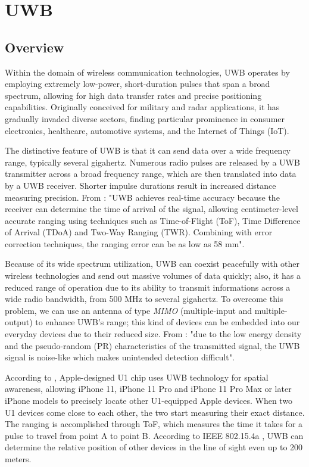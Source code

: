 \documentclass[english]{article}
\begin{document}
\section{UWB}\label{sec:uwb}
\subsection{Overview}
Within the domain of wireless communication technologies, UWB operates by employing extremely low-power, short-duration pulses that span a broad spectrum, allowing for high data transfer rates and precise positioning capabilities. Originally conceived for military and radar applications, it has gradually invaded diverse sectors, finding particular prominence in consumer electronics, healthcare, automotive systems, and the Internet of Things (IoT).

The distinctive feature of UWB is that it can send data over a wide frequency range, typically several gigahertz. Numerous radio pulses are released by a UWB transmitter across a broad frequency range, which are then translated into data by a UWB receiver. Shorter impulse durations result in increased distance measuring precision. From \cite{Coppens2022}: "UWB achieves real-time accuracy because the receiver can determine the time of arrival of the signal, allowing centimeter-level accurate ranging using techniques such as Time-of-Flight (ToF), Time Difference of Arrival (TDoA) and Two-Way Ranging (TWR). Combining with error correction techniques, the ranging error can be as low as 58 mm".

Because of its wide spectrum utilization, UWB can coexist peacefully with other wireless technologies and send out massive volumes of data quickly; also, it has a reduced range of operation due to its ability to transmit informations across a wide radio bandwidth, from 500 MHz to several gigahertz. To overcome this problem, we can use an antenna of type \textit{MIMO} (multiple-input and multiple-output) to enhance UWB's range; this kind of devices can be embedded into our everyday devices due to their reduced size. From \cite{di2006uwb}: "due to the low energy density and the pseudo-random (PR) characteristics of the transmitted signal, the UWB signal is noise-like which makes unintended detection difficult".

According to \cite{aps}, Apple-designed U1 chip uses UWB technology for spatial awareness, allowing iPhone 11, iPhone 11 Pro and iPhone 11 Pro Max or later iPhone models to precisely locate other U1-equipped Apple devices.
When two U1 devices come close to each other, the two start measuring their exact distance. The ranging is accomplished through ToF, which measures the time it takes for a pulse to travel from point A to point B. According to IEEE 802.15.4a \cite{5394030}, UWB can determine the relative position of other devices in the line of sight even up to 200 meters.
\end{document}
